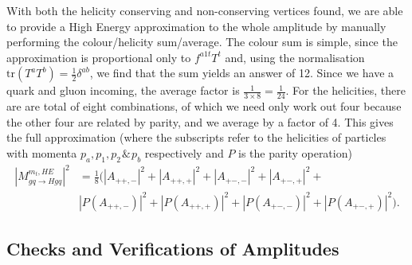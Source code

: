 With both the helicity conserving and non-conserving vertices found, we are able to provide a High Energy approximation to the whole amplitude by manually performing the colour/helicity sum/average. The colour sum is simple, since the approximation is proportional only to $f^{a1t} T^t$ and, using the normalisation $\text{tr}(T^a T^b) = \frac{1}{2}\delta^{ab}$, we find that the sum yields an answer of 12. Since we have a quark and gluon incoming, the average factor is $\frac{1}{3 \times 8} = \frac{1}{24}$. For the helicities, there are are total of eight combinations, of which we need only work out four because the other four are related by parity, and we average by a factor of 4.  This gives the full approximation (where the subscripts refer to the helicities of particles with momenta $p_a,p_1,p_2 \hspace{1pt} \& \hspace{1pt} p_b$ respectively and $P$ is the parity operation)
\begin{equation}
\begin{split}
|M_{gq \to Hgq}^{m_t, HE}|^2 &= \frac{1}{8} \Big( |A_{++,-}|^2 + |A_{++,+}|^2 + |A_{+-,-}|^2 + |A_{+-,+}|^2 + \\
&|P(A_{++,-})|^2 + |P(A_{++,+})|^2 + |P(A_{+-,-})|^2 + |P(A_{+-,+})|^2 \Big).
\end{split}
\end{equation}

\subsection{Checks and Verifications of Amplitudes}

